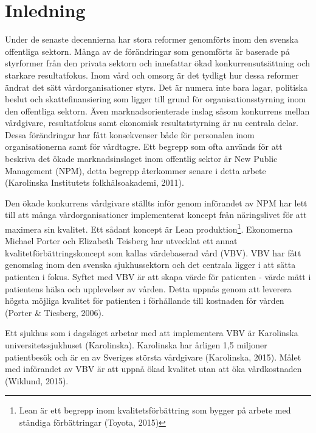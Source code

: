 \tableofcontents

\newpage

\listoffigures
\begingroup
\let\clearpage\relax
\listoftables
\endgroup

\newpage

\clearpage
{} 

\section{Inledning}

Under de senaste decennierna har stora reformer genomförts inom den svenska
offentliga sektorn. Många av de förändringar som genomförts är baserade på
styrformer från den privata sektorn och innefattar ökad konkurrensutsättning och
starkare resultatfokus. Inom vård och omsorg är det tydligt hur dessa reformer
ändrat det sätt vårdorganisationer styrs. Det är numera inte bara lagar,
politiska beslut och skattefinansiering som ligger till grund för
organisationsstyrning inom den offentliga sektorn. Även marknadsorienterade
inslag såsom konkurrens mellan vårdgivare, resultatfokus samt ekonomisk
resultatstyrning är nu centrala delar. Dessa förändringar har fått konsekvenser
både för personalen inom organisationerna samt för vårdtagre. Ett begrepp som
ofta används för att beskriva det ökade marknadsinslaget inom offentlig sektor är New Public Management (NPM), detta begrepp återkommer senare i detta arbete (Karolinska Institutets folkhälsoakademi, 2011).
 
Den ökade konkurrens vårdgivare ställts inför genom införandet av NPM har lett till att många vårdorganisationer implementerat koncept från näringslivet för att maximera sin kvalitet. Ett sådant koncept är Lean produktion\footnote{ Lean är ett begrepp inom kvalitetsförbättring som bygger på arbete med ständiga förbättringar (Toyota, 2015)}. Ekonomerna Michael Porter och Elizabeth Teisberg har utvecklat ett annat kvalitetförbättringskoncept som kallas värdebaserad vård (VBV). VBV har fått genomslag inom den svenska sjukhussektorn och det centrala ligger i att sätta patienten i fokus. Syftet med VBV är att skapa värde för patienten - värde mätt i patientens hälsa och upplevelser av vården. Detta uppnås genom att leverera högsta möjliga kvalitet för patienten i förhållande till kostnaden för vården (Porter \& Tiesberg, 2006).
 
Ett sjukhus som i dagsläget arbetar med att implementera VBV är Karolinska universitetssjukhuset (Karolinska). Karolinska har årligen 1,5 miljoner patientbesök och är en av Sveriges största vårdgivare (Karolinska, 2015). Målet med införandet av VBV är att uppnå ökad kvalitet utan att öka vårdkostnaden (Wiklund, 2015).

